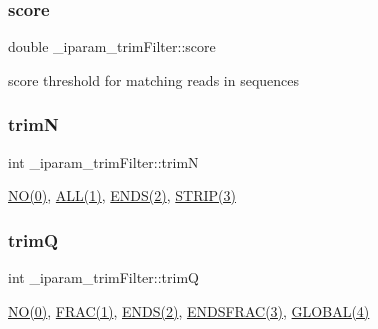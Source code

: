 \subsubsection{\texorpdfstring{score}{score}}
{\footnotesize\ttfamily double \+\_\+iparam\+\_\+trim\+Filter\+::score}

score threshold for matching reads in sequences \mbox{\label{struct__iparam__trimFilter_a5f2d247cc26608ed5cc9e2d6943940d7}} 
\subsubsection{\texorpdfstring{trimN}{trimN}}
{\footnotesize\ttfamily int \+\_\+iparam\+\_\+trim\+Filter\+::trimN}

\mbox{\hyperlink{defines_8h_a996bde01ecac342918f0a2c4e7ce7bd5}{N\+O(0)}}, \mbox{\hyperlink{defines_8h_a1edd1ea8bddaf4d9c5eb3eae1ee1726a}{A\+L\+L(1)}}, \mbox{\hyperlink{defines_8h_a052e72209cfac2ff9aa78294f0bebea8}{E\+N\+D\+S(2)}}, \mbox{\hyperlink{defines_8h_a53529d9638a1d70f6e5989dedf4c2672}{S\+T\+R\+I\+P(3)}} \mbox{\label{struct__iparam__trimFilter_a5b5344041c9313230de07c9485227203}} 
\subsubsection{\texorpdfstring{trimQ}{trimQ}}
{\footnotesize\ttfamily int \+\_\+iparam\+\_\+trim\+Filter\+::trimQ}

\mbox{\hyperlink{defines_8h_a996bde01ecac342918f0a2c4e7ce7bd5}{N\+O(0)}}, \mbox{\hyperlink{defines_8h_a653af6bd29f56a2699de26a928820da7}{F\+R\+A\+C(1)}}, \mbox{\hyperlink{defines_8h_a052e72209cfac2ff9aa78294f0bebea8}{E\+N\+D\+S(2)}}, \mbox{\hyperlink{defines_8h_abf0b71573c7ffc4f6746c24c9abc202a}{E\+N\+D\+S\+F\+R\+A\+C(3)}}, \mbox{\hyperlink{defines_8h_a3de33738fd3c7e77bffbcfaefc3e7645}{G\+L\+O\+B\+A\+L(4)}} \mbox{\label{struct__iparam__trimFilter_a284e4e63e7c10f10a5143d97dcada35c}} 
